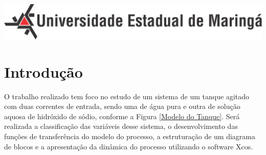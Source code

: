 \documentclass[
	12pt,				%
	openright,			%
	oneside,			%
	a4paper,			%
	english,			%
	french,				%
	spanish,			%
	brazil				%
	]{abntex2}
\begin{document}
\begin{minipage}[c][0cm][c]{0cm} %

\centering

\includegraphics[scale=0.45]{../../Pictures/uem-modelo-04.png}  
\end{minipage}


\frenchspacing 


\imprimircapa



 
 


\tableofcontents*
\cleardoublepage

\textual

\chapter{Introdução}
\pagestyle{fancy}

O trabalho realizado tem foco no estudo de um sistema de um tanque agitado com duas correntes de entrada, sendo uma de água pura e outra de solução aquosa de hidróxido de sódio, conforme a Figura \ref{Modelo do Tanque}. Será realizada a classificação das variáveis desse sistema, o desenvolvimento das funções de transferência do modelo do processo, a estruturação de um diagrama de blocos e a apresentação da dinâmica do processo utilizando o software Xcos.
\end{document}
